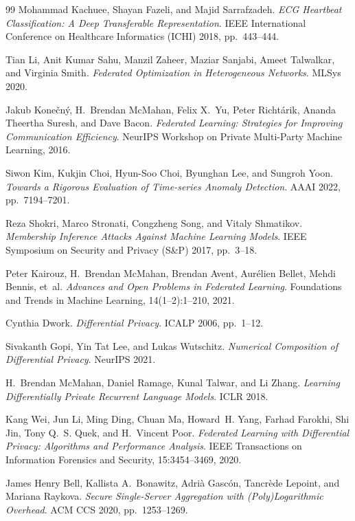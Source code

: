 \documentclass[11pt,a4paper]{report}
\begin{document}
\begin{thebibliography}{99}
Mohammad Kachuee, Shayan Fazeli, and Majid Sarrafzadeh.
\emph{ECG Heartbeat Classification: A Deep Transferable Representation}.
IEEE International Conference on Healthcare Informatics (ICHI) 2018,
pp.\ 443--444.

Tian Li, Anit Kumar Sahu, Manzil Zaheer, Maziar Sanjabi, Ameet Talwalkar,
and Virginia Smith.
\emph{Federated Optimization in Heterogeneous Networks}.
MLSys 2020.

Jakub Kone{\v{c}}n{\'y}, H.~Brendan McMahan, Felix X.\ Yu, Peter Richt{\'a}rik,
Ananda Theertha Suresh, and Dave Bacon.
\emph{Federated Learning: Strategies for Improving Communication Efficiency}.
NeurIPS Workshop on Private Multi-Party Machine Learning, 2016.

Siwon Kim, Kukjin Choi, Hyun-Soo Choi, Byunghan Lee, and Sungroh Yoon.
\emph{Towards a Rigorous Evaluation of Time-series Anomaly Detection}.
AAAI 2022, pp.\ 7194--7201.

Reza Shokri, Marco Stronati, Congzheng Song, and Vitaly Shmatikov.
\emph{Membership Inference Attacks Against Machine Learning Models}.
IEEE Symposium on Security and Privacy (S\&P) 2017, pp.\ 3--18.

Peter Kairouz, H.~Brendan McMahan, Brendan Avent, Aur{\'e}lien Bellet,
Mehdi Bennis, et~al.
\emph{Advances and Open Problems in Federated Learning}.
Foundations and Trends in Machine Learning, 14(1--2):1--210, 2021.

Cynthia Dwork.
\emph{Differential Privacy}.
ICALP 2006, pp.\ 1--12.

Sivakanth Gopi, Yin Tat Lee, and Lukas Wutschitz.
\emph{Numerical Composition of Differential Privacy}.
NeurIPS 2021.

H.~Brendan McMahan, Daniel Ramage, Kunal Talwar, and Li Zhang.
\emph{Learning Differentially Private Recurrent Language Models}.
ICLR 2018.

Kang Wei, Jun Li, Ming Ding, Chuan Ma, Howard~H. Yang, Farhad Farokhi,
Shi Jin, Tony Q.~S. Quek, and H.~Vincent Poor.
\emph{Federated Learning with Differential Privacy: Algorithms and
Performance Analysis}.
IEEE Transactions on Information Forensics and Security, 15:3454--3469,
2020.

James Henry Bell, Kallista A.\ Bonawitz, Adri{\`a} Gasc{\'o}n, Tancr{\`e}de
Lepoint, and Mariana Raykova.
\emph{Secure Single-Server Aggregation with (Poly)Logarithmic Overhead}.
ACM CCS 2020, pp.\ 1253--1269.


\end{thebibliography}
\end{document}
